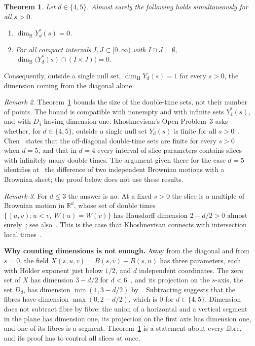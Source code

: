 \documentclass[11pt]{amsart}
\newtheorem{theorem}{Theorem}[section]
\theoremstyle{remark}
\newtheorem{remark}[theorem]{Remark}
\newcommand{\R}{\mathbb{R}}
\newcommand{\dimH}{\dim_{\mathrm H}}
\newcommand{\dimB}{\overline{\dim}_{\mathrm B}}
\begin{document}
\begin{theorem}\label{thm:main}
Let $d\in\{4,5\}$. Almost surely the following holds simultaneously for all $s>0$.
\begin{enumerate}
\item[(a)] $\dimH Y^*_d(s)=0$.
\item[(b)] For all compact intervals $I,J\subset[0,\infty)$ with $I\cap J=\emptyset$,
$\dimB\bigl(Y^*_d(s)\cap(I\times J)\bigr)=0$.
\end{enumerate}
\end{theorem}

Consequently, outside a single null set, $\dimH Y_d(s)=1$ for every $s>0$, the dimension coming from the diagonal alone.

\begin{remark}\label{rem:scope}
Theorem~\ref{thm:main} bounds the size of the double-time sets, not their number of points. The bound is compatible with
nonempty and with infinite sets $Y^*_4(s)$, and with $D_4$ having dimension one. Khoshnevisan's Open Problem~3 asks
whether, for $d\in\{4,5\}$, outside a single null set $Y_d(s)$ is finite for all $s>0$~\cite[Section~8.2]{Kho05}.
Chen~\cite[Theorems~1.3.3 and~1.3.4]{Che26} states that the off-diagonal double-time sets are finite for every $s>0$
when $d=5$, and that in $d=4$ every interval of slice parameters contains slices with infinitely many double times. The
argument given there for the case $d=5$ identifies at~\cite[(4.42)]{Che26} the difference of two independent Brownian
motions with a Brownian sheet; the proof below does not use these results.
\end{remark}

\begin{remark}\label{rem:low}
For $d\le3$ the answer is no. At a fixed $s>0$ the slice is a multiple of Brownian motion in $\R^d$, whose set of double
times $\{(u,v):u<v,\ W(u)=W(v)\}$ has Hausdorff dimension $2-d/2>0$ almost surely~\cite{Ros84}; see
also~\cite[(4.2)]{KWX06}. This is the case that Khoshnevisan connects with intersection local
times~\cite[Section~8.2]{Kho05}.
\end{remark}

\textbf{Why counting dimensions is not enough.} Away from the diagonal and from $s=0$, the field
$X(s,u,v)=B(s,v)-B(s,u)$ has three parameters, each with H\"older exponent just below $1/2$, and $d$ independent
coordinates. The zero set of $X$ has dimension $3-d/2$ for $d<6$~\cite[Theorem~5.1 and (8.1)]{Kho05}, and its
projection on the $s$-axis, the set $D_d$, has dimension $\min(1,3-d/2)$ by~\cite[(1.12)]{Kho05}. Subtracting
suggests that the fibres have dimension $\max(0,2-d/2)$, which is $0$ for $d\in\{4,5\}$. Dimension does not subtract
fibre by fibre: the union of a horizontal and a vertical segment in the plane has dimension one, its projection on the
first axis has dimension one, and one of its fibres is a segment. Theorem~\ref{thm:main} is a statement about every
fibre, and its proof has to control all slices at once.
\end{document}
